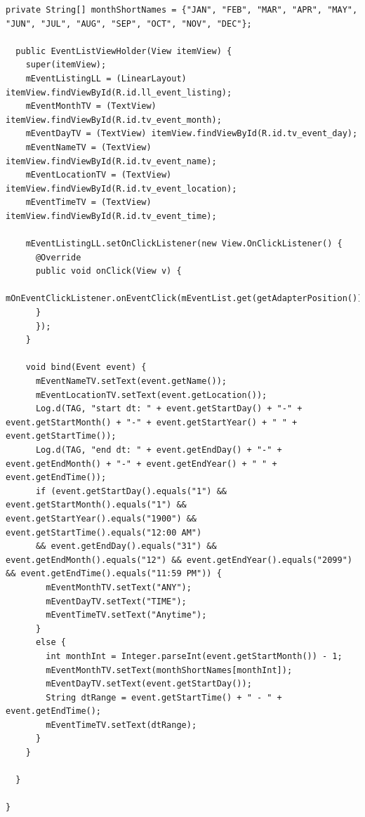 \documentclass[onecolumn, draftclsnofoot,10pt, compsoc]{IEEEtran}
\begin{document}
\begin{lstlisting}[style=java]
  private String[] monthShortNames = {"JAN", "FEB", "MAR", "APR", "MAY", "JUN", "JUL", "AUG", "SEP", "OCT", "NOV", "DEC"};

  public EventListViewHolder(View itemView) {
    super(itemView);
    mEventListingLL = (LinearLayout) itemView.findViewById(R.id.ll_event_listing);
    mEventMonthTV = (TextView) itemView.findViewById(R.id.tv_event_month);
    mEventDayTV = (TextView) itemView.findViewById(R.id.tv_event_day);
    mEventNameTV = (TextView) itemView.findViewById(R.id.tv_event_name);
    mEventLocationTV = (TextView) itemView.findViewById(R.id.tv_event_location);
    mEventTimeTV = (TextView) itemView.findViewById(R.id.tv_event_time);

    mEventListingLL.setOnClickListener(new View.OnClickListener() {
      @Override
      public void onClick(View v) {
        mOnEventClickListener.onEventClick(mEventList.get(getAdapterPosition()));
      }
      });
    }

    void bind(Event event) {
      mEventNameTV.setText(event.getName());
      mEventLocationTV.setText(event.getLocation());
      Log.d(TAG, "start dt: " + event.getStartDay() + "-" + event.getStartMonth() + "-" + event.getStartYear() + " " + event.getStartTime());
      Log.d(TAG, "end dt: " + event.getEndDay() + "-" + event.getEndMonth() + "-" + event.getEndYear() + " " + event.getEndTime());
      if (event.getStartDay().equals("1") &&      event.getStartMonth().equals("1") && event.getStartYear().equals("1900") && event.getStartTime().equals("12:00 AM")
      && event.getEndDay().equals("31") && event.getEndMonth().equals("12") && event.getEndYear().equals("2099") && event.getEndTime().equals("11:59 PM")) {
        mEventMonthTV.setText("ANY");
        mEventDayTV.setText("TIME");
        mEventTimeTV.setText("Anytime");
      }
      else {
        int monthInt = Integer.parseInt(event.getStartMonth()) - 1;
        mEventMonthTV.setText(monthShortNames[monthInt]);
        mEventDayTV.setText(event.getStartDay());
        String dtRange = event.getStartTime() + " - " + event.getEndTime();
        mEventTimeTV.setText(dtRange);
      }
    }

  }

}

    \end{lstlisting}
    \newpage
\end{document}
